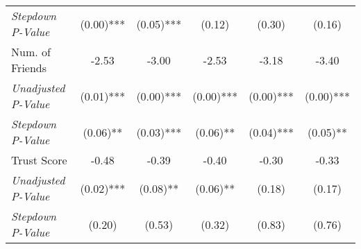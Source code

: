 \begin{tabular}{l c c c c c}
\quad \textit{Stepdown P-Value} & (0.00)*** & (0.05)*** & (0.12) & (0.30) & (0.16) \\
Num. of Friends & -2.53 & -3.00 & -2.53 & -3.18 & -3.40 \\
\quad \textit{Unadjusted P-Value} & (0.01)*** & (0.00)*** & (0.00)*** & (0.00)*** & (0.00)*** \\
\quad \textit{Stepdown P-Value} & (0.06)** & (0.03)*** & (0.06)** & (0.04)*** & (0.05)** \\
Trust Score & -0.48 & -0.39 & -0.40 & -0.30 & -0.33 \\
\quad \textit{Unadjusted P-Value} & (0.02)*** & (0.08)** & (0.06)** & (0.18) & (0.17) \\
\quad \textit{Stepdown P-Value} & (0.20) & (0.53) & (0.32) & (0.83) & (0.76) \\
\bottomrule
\end{tabular}

